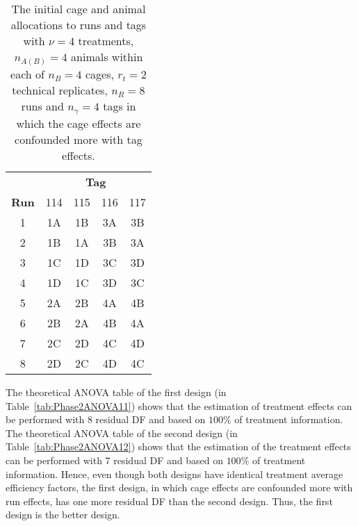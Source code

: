 \begin{table}[ht]
\caption{The initial cage and animal allocations to runs and tags with $\nu = 4$ treatments, $n_{A(B)} = 4$ animals within each of $n_B = 4$ cages, $r_t = 2$ technical replicates, $n_R = 8$ runs and $n_\gamma = 4$ tags in which the cage effects are confounded more with tag effects.}           
\begin{tabular}[t]{c|cccc}                                 
	& \multicolumn{4}{c}{{\bf Tag}} \\                     
{\bf Run}  & \textnormal{114} & \textnormal{115} & \textnormal{116} & \textnormal{117} \\ 
\hline                                                   
	\textnormal{1}  & 1A & 1B & 3A & 3B \\ 
	\textnormal{2}  & 1B & 1A & 3B & 3A \\ 
	\textnormal{3}  & 1C & 1D & 3C & 3D \\ 
	\textnormal{4}  & 1D & 1C & 3D & 3C \\ 
	\textnormal{5}  & 2A & 2B & 4A & 4B \\ 
	\textnormal{6}  & 2B & 2A & 4B & 4A \\ 
	\textnormal{7}  & 2C & 2D & 4C & 4D \\ 
	\textnormal{8}  & 2D & 2C & 4D & 4C \\            
\end{tabular}                                           
\label{tab:cagAniDes12}                                  
\end{table}   

The theoretical ANOVA table of the first design (in Table~\ref{tab:Phase2ANOVA11}) shows that the estimation of treatment effects can be performed with 8 residual DF and based on $100\%$ of treatment information. The theoretical ANOVA table of the second design (in Table~\ref{tab:Phase2ANOVA12}) shows that the estimation of the treatment effects can be performed with 7 residual DF and based on $100\%$ of treatment information. Hence, even though both designs have identical treatment average efficiency factors, the first design, in which cage effects are confounded more with run effects, has one more residual DF than the second design. Thus, the first design is the better design. 

